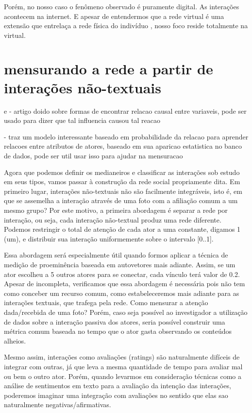 \documentclass{article}
\begin{document}
Porém, no nosso caso o fenômeno observado é puramente digital. As interações
acontecem na internet. E apesar de entendermos que a rede virtual é uma extensão
que entrelaça a rede física do indivíduo \cite{Sassen2002}, nosso foco
reside totalmente na virtual. 


\section{mensurando a rede a partir de interações não-textuais}

\cite{Cooper1997} e \cite{Silverstein2000} - artigo doido sobre formas de
encontrar relacao causal entre variaveis, pode ser usado para dizer que tal
influencia causou tal reacao

\cite{Friedman1999} - traz um modelo interessante baseado em probabilidade da
relacao para aprender relacoes entre atributos de atores, baseado em sua
aparicao estatistica no banco de dados, pode ser util usar isso para ajudar na
mensuracao

Agora que podemos definir os medianeiros e classificar as interações sob estudo
em seus tipos, vamos passar à construção da rede social propriamente dita. Em
primeiro lugar, interações não-textuais não são facilmente integráveis, isto é,
em que se assemelha a interação através de uma foto com a afiliação comum a
um mesmo grupo? Por este motivo, a primeira abordagem é separar a rede por
interação, ou seja, cada interação não-textual produz uma rede diferente.
Podemos restringir o total de atenção de cada ator a uma constante, digamos 1
(um), e distribuir sua interação uniformemente sobre o intervalo [0..1].

Essa abordagem será especialmente útil quando formos aplicar a técnica de
medição de proeminência baseada em autovetores mais adiante. Assim, se um
ator escolheu a 5 outros atores para se conectar, cada vínculo terá valor de
0.2. Apesar de incompleta, verificamos que essa abordagem é necessária pois não
tem como conceber um recurso comum, como estabeleceremos mais adiante para as
interações textuais, que trafega pela rede. Como mensurar a atenção
dada/recebida de uma foto? Porém, caso seja possível ao investigador a
utilização de dados sobre a interação passiva dos atores, seria possível
construir uma métrica comum baseada no tempo que o ator gasta observando os
conteúdos alheios.

Mesmo assim, interações como avaliações (ratings) são naturalmente difíceis de
integrar com outras, já que leva a mesma quantidade de tempo para avaliar mal ou
bem o outro ator. Porém, quando levarmos em consideração técnicas como a análise
de sentimentos em texto para a avaliação da intenção das interações, poderemos
imaginar uma integração com avaliações no sentido que elas sao naturalmente
negativas/afirmativas.
\end{document}
